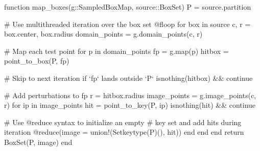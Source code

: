\clearpage

\begin{jllisting}[float, floatplacement=hb!, language=julia, style=jlcodestyle, label=lst:boxmap, caption=Function to calculate $f(\mathcal{B})$]
    function map_boxes(g::SampledBoxMap, source::BoxSet)
        P = source.partition

        # Use multithreaded iteration over the box set
        @floop for box in source
            c, r = box.center, box.radius
            domain_points = g.domain_points(c, r)
            
            # Map each test point
            for p in domain_points
            fp = g.map(p)
            hitbox = point_to_box(P, fp)

            # Skip to next iteration if `fp` lands outside `P`
            isnothing(hitbox) && continue

                # Add perturbations to fp
                r = hitbox.radius
                image_points = g.image_points(c, r)
                for ip in image_points
                hit = point_to_key(P, ip)
                isnothing(hit) && continue
                
                # Use @reduce syntax to initialize an empty
                # key set and add hits during iteration
                @reduce(image = union!(Set{keytype(P)}(), hit))
                end
            end
        end
        return BoxSet(P, image)
    end 
\end{jllisting}

